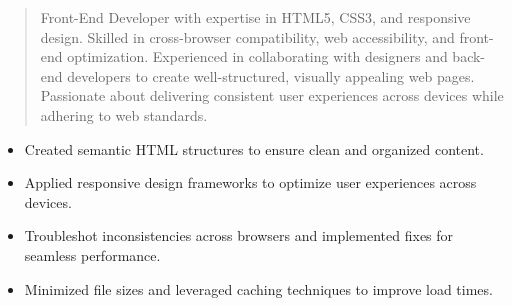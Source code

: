 



\makecvheader

\begin{quote}
  \noindent
  Front-End Developer with expertise in HTML5, CSS3, and responsive design. Skilled in cross-browser compatibility, web accessibility, and front-end optimization. Experienced in collaborating with designers and back-end developers to create well-structured, visually appealing web pages. Passionate about delivering consistent user experiences across devices while adhering to web standards.
\end{quote}

\par\smallskip
\noindent
\begin{minipage}{20cm}
  \begin{minipage}{9.75cm}
    \begin{itemize}
      \item Created semantic HTML structures to ensure clean and organized content.
      \item Applied responsive design frameworks to optimize user experiences across devices.
    \end{itemize}
  \end{minipage}
  \hfill
  \begin{minipage}{9.75cm}
    \begin{itemize}
      \item Troubleshot inconsistencies across browsers and implemented fixes for seamless performance.
      \item Minimized file sizes and leveraged caching techniques to improve load times.
    \end{itemize}
  \end{minipage}
\end{minipage}
\par\smallskip
\divider

